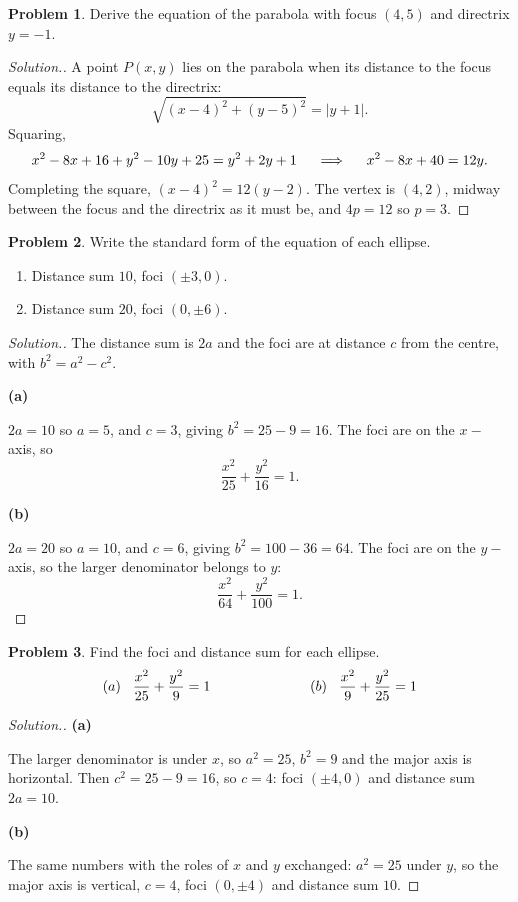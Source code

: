 \documentclass[11pt,a4paper]{article}
\theoremstyle{definition}
\newtheorem{problemx}{Problem}[subsection]
\newenvironment{problem}{\begin{problemx}}{\end{problemx}}
\newenvironment{solution}
  {\renewcommand{\qedsymbol}{}\begin{proof}[\textit{Solution}.]}
  {\end{proof}}
\newcommand{\subhead}[1]{%
  \par\medskip\noindent\textbf{#1}\par\nobreak\smallskip}
\begin{document}
\begin{problem}
Derive the equation of the parabola with focus $(4,5)$ and directrix $y = -1$.
\end{problem}
\begin{solution}
A point $P(x,y)$ lies on the parabola when its distance to the focus equals its
distance to the directrix:
$$\sqrt{(x-4)^2 + (y-5)^2} = \left|y + 1\right| .$$
Squaring,
$$x^2 - 8x + 16 + y^2 - 10y + 25 = y^2 + 2y + 1
\hspace{0.4cm}\implies\hspace{0.4cm} x^2 - 8x + 40 = 12y .$$
Completing the square, $(x-4)^2 = 12(y-2)$. The vertex is $(4,2)$, midway
between the focus and the directrix as it must be, and $4p = 12$ so $p = 3$.
\end{solution}

\begin{problem}
Write the standard form of the equation of each ellipse.
\begin{enumerate}
\item[(a)] Distance sum $10$, foci $(\pm 3, 0)$.
\item[(b)] Distance sum $20$, foci $(0, \pm 6)$.
\end{enumerate}
\end{problem}
\begin{solution}
The distance sum is $2a$ and the foci are at distance $c$ from the centre, with
$b^2 = a^2 - c^2$.

\subhead{(a)}
$2a = 10$ so $a = 5$, and $c = 3$, giving $b^2 = 25 - 9 = 16$. The foci are on
the $x-$axis, so
$$\frac{x^2}{25} + \frac{y^2}{16} = 1 .$$

\subhead{(b)}
$2a = 20$ so $a = 10$, and $c = 6$, giving $b^2 = 100 - 36 = 64$. The foci are on
the $y-$axis, so the larger denominator belongs to $y$:
$$\frac{x^2}{64} + \frac{y^2}{100} = 1 .$$
\end{solution}

\begin{problem}
Find the foci and distance sum for each ellipse.
$$(a)\hspace{0.3cm}\frac{x^2}{25} + \frac{y^2}{9} = 1
\hspace{2.5cm} (b)\hspace{0.3cm}\frac{x^2}{9} + \frac{y^2}{25} = 1$$
\end{problem}
\begin{solution}
\subhead{(a)}
The larger denominator is under $x$, so $a^2 = 25$, $b^2 = 9$ and the major axis
is horizontal. Then $c^2 = 25 - 9 = 16$, so $c = 4$: foci $(\pm 4, 0)$ and
distance sum $2a = 10$.

\subhead{(b)}
The same numbers with the roles of $x$ and $y$ exchanged: $a^2 = 25$ under $y$,
so the major axis is vertical, $c = 4$, foci $(0, \pm 4)$ and distance sum $10$.
\end{solution}
\end{document}
